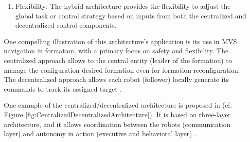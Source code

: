 \begin{itemize}
\begin{enumerate}
    \item Flexibility: The hybrid architecture provides the flexibility to adjust the global task or control strategy based on inputs from both the centralized and decentralized control components. 
\end{enumerate}

One compelling illustration of this architecture's application is its use in MVS navigation in formation, with a primary focus on safety and flexibility. The centralized approach allows to the central entity (leader of the formation) to manage the configuration desired formation even for formation reconfiguration. The decentralized approach allows each robot (follower) locally generate its commands to track its assigned target \cite{ventura2015safe}. 

One example of the centralized/decentralized architecture is proposed in \cite{simmons2001first} (cf. Figure \ref{fig:CentralizedDecentralizedArchitecture}). It is based on three-layer architecture, and it allows coordination between the robots (communication layer) and autonomy in action (executive and behavioral layer) \cite{ventura2015safe}\cite{simmons2001first}. 
    
\end{itemize}


